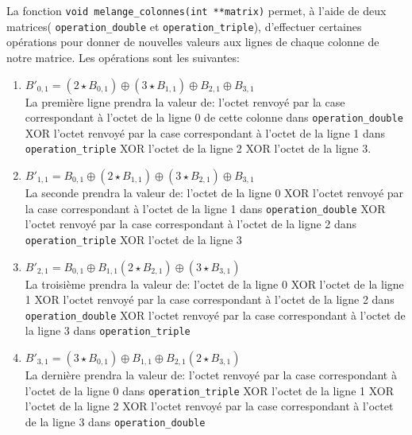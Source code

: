 \documentclass[french, 12pt]{article}
\begin{document}
	La fonction \verb|void melange_colonnes(int **matrix)| permet, à l'aide de deux matrices( \verb|operation_double| et \verb|operation_triple|), d'effectuer certaines opérations pour donner de nouvelles valeurs aux lignes de chaque colonne de notre matrice.
	Les opérations sont les suivantes:
	\begin{enumerate}
		\vspace{0.5cm}
		\item \hspace{2cm}
		\begin{math}
			B'_{0,1} = (2 \star B_{0,1}) \oplus (3 \star B_{1,1}) \oplus B_{2,1} \oplus B_{3,1}
		\end{math} \\
		La première ligne prendra la valeur de: l'octet renvoyé par la case correspondant à l'octet de la ligne 0 de cette colonne dans \verb|operation_double| XOR l'octet renvoyé par la case correspondant à l'octet de la ligne 1 dans \verb|operation_triple| XOR l'octet de la ligne 2 XOR l'octet de la ligne 3.
		\vspace{0.5cm}
		\item \hspace{2cm}
		\begin{math}
			B'_{1,1} = B_{0,1} \oplus (2 \star B_{1,1}) \oplus (3 \star B_{2,1}) \oplus B_{3,1}
		\end{math} \\
		La seconde prendra la valeur de: l'octet de la ligne 0 XOR  l'octet renvoyé par la case correspondant à l'octet de la ligne 1 dans \verb|operation_double| XOR l'octet renvoyé par la case correspondant à l'octet de la ligne 2 dans \verb|operation_triple| XOR l'octet de la ligne 3
		\vspace{0.5cm}
		\item \hspace{2cm}
		\begin{math}
			B'_{2,1} = B_{0,1} \oplus B_{1,1} (2 \star B_{2,1}) \oplus (3 \star B_{3,1})
		\end{math} \\
		La troisième prendra la valeur de: l'octet de la ligne 0 XOR l'octet de la ligne 1 XOR  l'octet renvoyé par la case correspondant à l'octet de la ligne 2 dans \verb|operation_double| XOR l'octet renvoyé par la case correspondant à l'octet de la ligne 3 dans \verb|operation_triple| 
		\vspace{0.5cm}
		\item \hspace{2cm}
		\begin{math}
			B'_{3,1} = (3 \star B_{0,1}) \oplus B_{1,1} \oplus B_{2,1} (2 \star B_{3,1})
		\end{math} \\
		La dernière prendra la valeur de: l'octet renvoyé par la case correspondant à l'octet de la ligne 0 dans \verb|operation_triple| XOR l'octet de la ligne 1 XOR l'octet de la ligne 2 XOR  l'octet renvoyé par la case correspondant à l'octet de la ligne 3 dans \verb|operation_double|
	\end{enumerate}
\end{document}
